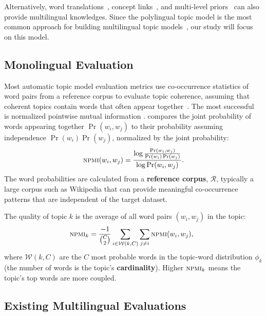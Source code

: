 Alternatively, word translations~\cite{JagarlamudiD10}, concept links~\cite{GutierrezSLMG16,YangBR17}, and multi-level
priors~\cite{KrstovskiSK16} can also provide multilingual
knowledges.  Since
the polylingual topic model is the most common approach for building
multilingual topic
models~\cite{VulicSM13,VulicSTM15,LiuDM15,KrstovskiS16}, our study
will focus on this model.







\subsection{Monolingual Evaluation}





Most automatic topic model evaluation metrics use co-occurrence
statistics of word pairs from a reference corpus to evaluate topic
coherence, assuming that coherent topics contain words that often
appear together~\cite{NewmanLGB10}.  The most
successful~\cite{LauNB14} is normalized pointwise
mutual information \cite[\npmi{}]{bouma}.  \npmi{} compares the joint
probability of words appearing together $\Pr(w_i,w_j)$ to their
probability assuming independence $\Pr(w_i)\Pr(w_j)$, normalized by
the joint probability:
\begin{align}
\label{eq:npmi}
\textsc{npmi}{}(w_i, w_j) = \frac{\log \frac{\Pr(w_i,w_j)}{\Pr(w_i)\Pr(w_j)}}{\log\Pr(w_i,w_j)}.
\end{align}
The word probabilities are calculated from a {\bf reference corpus},
$\mathcal{R}$, typically a large corpus such as Wikipedia that can
provide meaningful co-occurrence patterns that are independent of the
target dataset.

The quality of topic $k$ is the average \npmi{} of
all word pairs $(w_i,w_j)$ in the topic:
\begin{align}
\hspace{-5pt}
\textsc{npmi}{}_k = \frac{-1}{\binom{C}{2}}\sum_{i \in \mathcal{W}(k, C)} \sum_{j \neq i} \textsc{npmi}{}(w_i, w_j),
\end{align}
where $\mathcal{W}(k, C)$ are the $C$ most probable words in
the topic-word distribution $\phi_k$ (the number of words is the
topic's \textbf{cardinality}).  Higher 
$\textsc{npmi}{}_k$ means the topic's top words are more coupled.


\subsection{Existing Multilingual Evaluations}

